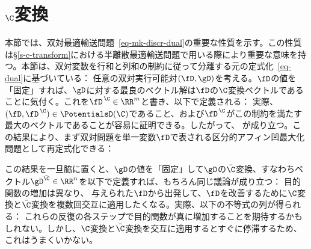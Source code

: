 \section{$\C$変換}\label{sec-c-transforms} 本節では、双対最適輸送問題~\eqref{eq-mk-discr-dual}の重要な性質を示す。この性質は\S\ref{s-c-transform}における半離散最適輸送問題で用いる際により重要な意味を持つ。本節は、双対変数を行和と列和の制約に従って分離する元の定式化~\eqref{eq-dual}に基づいている：
任意の双対実行可能対$(\fD,\gD)$を考える。$\fD$の値を「固定」すれば、$\gD$に対する最良のベクトル解は$\fD$の$\C$変換ベクトルであることに気付く。これを$\fD^{\,\C}\in\RR^m$と書き、以下で定義される：
実際、$(\fD,\fD^{\,\C})\in\PotentialsD(\C)$であること、および$\fD^{\,\C}$がこの制約を満たす最大のベクトルであることが容易に証明できる。したがって、
が成り立つ。この結果により、まず双対問題を単一変数$\fD$で表される区分的アフィン凹最大化問題として再定式化できる：

この結果を一旦脇に置くと、$\gD$の値を「固定」して$\gD$の$\bar{\C}$変換、すなわちベクトル$\gD^{\bar{\C}}\in\RR^n$を以下で定義すれば、もちろん同じ議論が成り立つ：
目的関数の増加は異なり、
与えられた$\fD$から出発して、$\fD$を改善するために$\C$変換と$\bar{\C}$変換を複数回交互に適用したくなる。実際、以下の不等式の列が得られる：
\eq{
	\dotp{\fD}{\a} + \dotp{\fD^{\,\C}}{\b} \leq \dotp{\fD^{\,\C\bar{\C}}}{\a} + \dotp{\fD^{\,\C}}{\b}\leq  \dotp{\fD^{\,\C\bar{\C}}}{\a} + \dotp{\fD^{\,\C\bar{\C}\C}}{\b}\leq  \dots
}
これらの反復の各ステップで目的関数が真に増加することを期待するかもしれない。しかし、$\C$変換と$\bar{\C}$変換を交互に適用するとすぐに停滞するため、これはうまくいかない。

